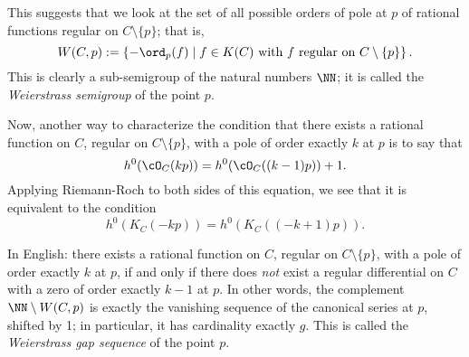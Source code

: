 This suggests that we look at the set of all possible orders of pole at $p$ of rational functions regular on $C \setminus \{p\}$; that is,
$$
W(C,p) := \left\{ -\ord_p(f) \mid f \in K(C) \text{ with $f$ regular on } C \setminus \{p\} \right\}.
$$
This is clearly a sub-semigroup of the natural numbers $\NN$; it is called the \emph{Weierstrass semigroup} of the point $p$.  

Now, another way to characterize the condition that there exists a rational function on $C$, regular on $C \setminus \{p\}$, with a pole of order exactly $k$ at $p$ is to say that
$$
h^0(\cO_C(kp)) = h^0(\cO_C((k-1)p)) + 1.
$$
Applying Riemann-Roch to both sides of this equation, we see that it is equivalent to the condition
$$
h^0(K_C(-kp)) = h^0(K_C((-k+1)p)).
$$

In English: there exists a rational function on $C$, regular on $C \setminus \{p\}$, with a pole of order exactly $k$ at $p$, if and only if there does \emph{not} exist a regular differential on $C$ with a zero of order exactly $k-1$ at $p$.
 In other words, the complement $\NN \setminus W(C,p)$ is exactly the vanishing sequence of the canonical series at $p$, shifted by 1; in particular, it has cardinality  exactly $g$. This is called the \emph{Weierstrass gap sequence} of the point $p$.

%
%

